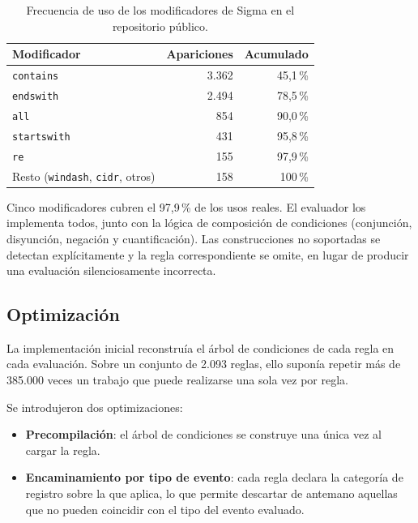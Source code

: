 \begin{table}[H]
\centering
\begin{tabular}{|l|r|r|}
\hline
\textbf{Modificador} & \textbf{Apariciones} & \textbf{Acumulado} \\
\hline
\texttt{contains}    & 3.362 & 45{,}1\,\% \\
\texttt{endswith}    & 2.494 & 78{,}5\,\% \\
\texttt{all}         &   854 & 90{,}0\,\% \\
\texttt{startswith}  &   431 & 95{,}8\,\% \\
\texttt{re}          &   155 & 97{,}9\,\% \\
\hline
Resto (\texttt{windash}, \texttt{cidr}, otros) & 158 & 100\,\% \\
\hline
\end{tabular}
\caption{Frecuencia de uso de los modificadores de Sigma en el repositorio público.}
\label{tab:modificadores}
\end{table}

Cinco modificadores cubren el 97,9\,\% de los usos reales. El evaluador los implementa
todos, junto con la lógica de composición de condiciones (conjunción, disyunción, negación
y cuantificación). Las construcciones no soportadas se detectan explícitamente y la regla
correspondiente se omite, en lugar de producir una evaluación silenciosamente incorrecta.

\subsection{Optimización}

La implementación inicial reconstruía el árbol de condiciones de cada regla en cada
evaluación. Sobre un conjunto de 2.093 reglas, ello suponía repetir más de 385.000 veces un
trabajo que puede realizarse una sola vez por regla.

Se introdujeron dos optimizaciones:

\begin{itemize}
    \item \textbf{Precompilación}: el árbol de condiciones se construye una única vez al
    cargar la regla.
    \item \textbf{Encaminamiento por tipo de evento}: cada regla declara la categoría de
    registro sobre la que aplica, lo que permite descartar de antemano aquellas que no pueden
    coincidir con el tipo del evento evaluado.
\end{itemize}


